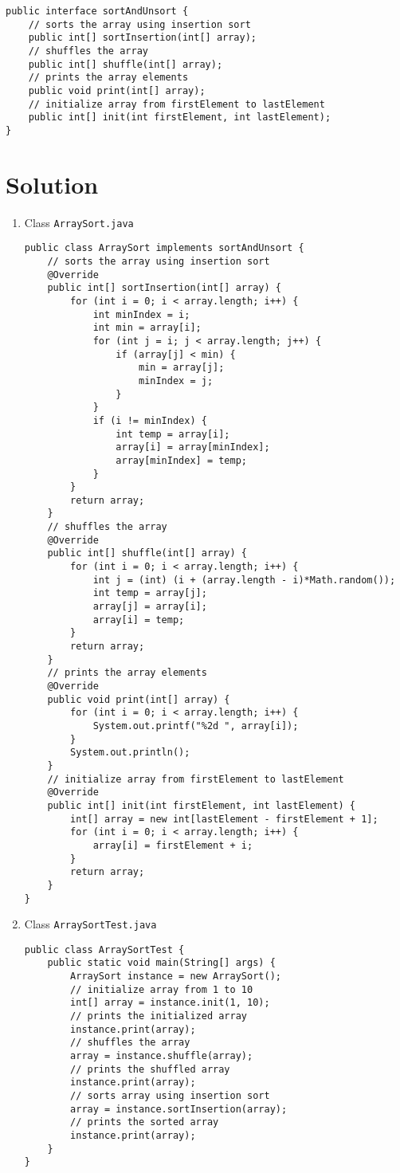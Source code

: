 \documentclass[12pt,letterpaper,twoside]{article}
\begin{document}
\lstset{language=java,tabsize=2}
\begin{lstlisting}
public interface sortAndUnsort {
	// sorts the array using insertion sort
	public int[] sortInsertion(int[] array);
	// shuffles the array
	public int[] shuffle(int[] array);
	// prints the array elements
	public void print(int[] array);
	// initialize array from firstElement to lastElement
	public int[] init(int firstElement, int lastElement);
}
\end{lstlisting}

\section*{Solution}

\begin{enumerate}
\item Class \texttt{ArraySort.java}

\lstset{language=java, tabsize=2}
\begin{lstlisting}
public class ArraySort implements sortAndUnsort {
	// sorts the array using insertion sort
	@Override
	public int[] sortInsertion(int[] array) {
		for (int i = 0; i < array.length; i++) {
			int minIndex = i;
			int min = array[i];
			for (int j = i; j < array.length; j++) {
				if (array[j] < min) {
					min = array[j];
					minIndex = j;
				}
			}
			if (i != minIndex) {
				int temp = array[i];
				array[i] = array[minIndex];
				array[minIndex] = temp;
			}
		}
		return array;
	}
	// shuffles the array
	@Override
	public int[] shuffle(int[] array) {
		for (int i = 0; i < array.length; i++) {
			int j = (int) (i + (array.length - i)*Math.random());
			int temp = array[j];
			array[j] = array[i];
			array[i] = temp;
		}
		return array;
	}
	// prints the array elements
	@Override
	public void print(int[] array) {
		for (int i = 0; i < array.length; i++) {
			System.out.printf("%2d ", array[i]);
		}
		System.out.println();
	}
	// initialize array from firstElement to lastElement
	@Override
	public int[] init(int firstElement, int lastElement) {
		int[] array = new int[lastElement - firstElement + 1];
		for (int i = 0; i < array.length; i++) {
			array[i] = firstElement + i;
		}
		return array;
	}
}
\end{lstlisting}

\item Class \texttt{ArraySortTest.java}

\lstset{language=java,tabsize=2}
\begin{lstlisting}
public class ArraySortTest {
	public static void main(String[] args) {
		ArraySort instance = new ArraySort();
		// initialize array from 1 to 10
		int[] array = instance.init(1, 10);
		// prints the initialized array
		instance.print(array);
		// shuffles the array
		array = instance.shuffle(array);
		// prints the shuffled array
		instance.print(array);
		// sorts array using insertion sort
		array = instance.sortInsertion(array);
		// prints the sorted array
		instance.print(array);
	}
}
\end{lstlisting}


\end{enumerate}
\end{document}
